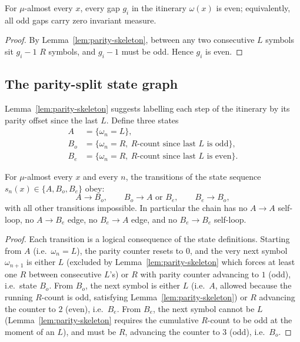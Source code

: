 \begin{proposition}
\label{prop:even-gaps}
For $\mu$-almost every $x$, every gap $g_i$ in the itinerary $\omega(x)$
is even; equivalently, all odd gaps carry zero invariant measure.
\end{proposition}

\begin{proof}
By Lemma~\ref{lem:parity-skeleton}, between any two consecutive $L$
symbols sit $g_i - 1$ $R$ symbols, and $g_i - 1$ must be odd. Hence
$g_i$ is even.
\end{proof}

\subsection{The parity-split state graph}

Lemma~\ref{lem:parity-skeleton} suggests labelling each step of the
itinerary by its parity offset since the last $L$. Define three states
\begin{align*}
    A &= \{ \omega_n = L \}, \\
    B_o &= \{ \omega_n = R, \ R\text{-count since last } L \text{ is odd} \}, \\
    B_e &= \{ \omega_n = R, \ R\text{-count since last } L \text{ is even} \}.
\end{align*}

\begin{proposition}
\label{prop:skeleton}
For $\mu$-almost every $x$ and every $n$, the transitions of the
state sequence $s_n(x) \in \{A, B_o, B_e\}$ obey:
\begin{equation}
  \label{eq:skeleton}
  A \to B_o, \qquad B_o \to A \text{ or } B_e, \qquad B_e \to B_o,
\end{equation}
with all other transitions impossible. In particular the chain has no
$A \to A$ self-loop, no $A \to B_e$ edge, no $B_e \to A$ edge, and no
$B_e \to B_e$ self-loop.
\end{proposition}

\begin{proof}
Each transition is a logical consequence of the state definitions.
Starting from $A$ (i.e.\ $\omega_n = L$), the parity counter resets to
$0$, and the very next symbol $\omega_{n+1}$ is either $L$ (excluded by
Lemma~\ref{lem:parity-skeleton} which forces at least one $R$ between
consecutive $L$'s) or $R$ with parity counter advancing to $1$ (odd),
i.e.\ state $B_o$. From $B_o$, the next symbol is either $L$ (i.e.\ $A$,
allowed because the running $R$-count is odd, satisfying
Lemma~\ref{lem:parity-skeleton}) or $R$ advancing the counter to $2$
(even), i.e.\ $B_e$. From $B_e$, the next symbol cannot be $L$
(Lemma~\ref{lem:parity-skeleton} requires the cumulative $R$-count to
be odd at the moment of an $L$), and must be $R$, advancing the
counter to $3$ (odd), i.e.\ $B_o$.
\end{proof}

